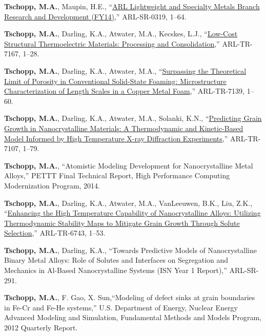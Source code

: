 \begin{cvlist}
\item
\textbf{Tschopp, M.A.}, Maupin, H.E., ``\href{https://apps.dtic.mil/dtic/tr/fulltext/u2/a615166.pdf}{ARL Lightweight and Specialty Metals Branch Research and Development (FY14)},'' ARL-SR-0319, 1--64.

\item
\textbf{Tschopp, M.A.}, Darling, K.A., Atwater, M.A., Kecskes, L.J., ``\href{https://apps.dtic.mil/sti/pdfs/ADA612940.pdf}{Low-Cost Structural Thermoelectric Materials: Processing and Consolidation},'' ARL-TR-7167, 1--28.

\item
\textbf{Tschopp, M.A.}, Darling, K.A.,  Atwater, M.A., ``\href{https://apps.dtic.mil/sti/pdfs/ADA612840.pdf}{Surpassing the Theoretical Limit of Porosity in Conventional Solid-State Foaming: Microstructure Characterization of Length Scales in a Copper Metal Foam},'' ARL-TR-7139, 1--60.

\item
\textbf{Tschopp, M.A.}, Darling, K.A.,  Atwater, M.A., Solanki, K.N., ``\href{https://apps.dtic.mil/dtic/tr/fulltext/u2/a611875.pdf}{Predicting Grain Growth in Nanocrystalline Materials: A Thermodynamic and Kinetic-Based Model Informed by High Temperature X-ray Diffraction Experiments},'' ARL-TR-7107, 1--79.

\item
\textbf{Tschopp, M.A.}, ``Atomistic Modeling Development for Nanocrystalline Metal Alloys,'' PETTT Final Technical Report, High Performance Computing Modernization Program, 2014.

\item
\textbf{Tschopp, M.A.}, Darling, K.A.,  Atwater, M.A., VanLeeuwen, B.K., Liu, Z.K., ``\href{https://apps.dtic.mil/dtic/tr/fulltext/u2/a590711.pdf}{Enhancing the High Temperature Capability of Nanocrystalline Alloys: Utilizing Thermodynamic Stability Maps to Mitigate Grain Growth Through Solute Selection},'' ARL-TR-6743, 1--53.

\item
\textbf{Tschopp, M.A.}, Darling, K.A., ``Towards Predictive Models of Nanocrystalline Binary Metal Alloys: Role of Solutes and Interfaces on Segregation and Mechanics in Al-Based Nanocrystalline Systems (ISN Year 1 Report),'' ARL-SR-291.

\item 
\textbf{Tschopp, M.A.}, F. Gao, X. Sun,``Modeling of defect sinks at grain boundaries in Fe-Cr and Fe-He systems,'' U.S. Department of Energy, Nuclear Energy Advanced Modeling and Simulation, Fundamental Methods and Models Program, 2012 Quarterly Report.


\end{cvlist}
